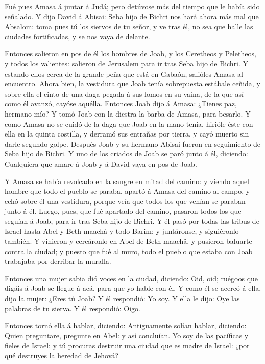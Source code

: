  Fué pues Amasa á juntar á Judá; pero detúvose más del
tiempo que le había sido señalado.  Y dijo David á Abisai:
Seba hijo de Bichri nos hará ahora más mal que Absalom: toma pues tú los
siervos de tu señor, y ve tras él, no sea que halle las ciudades
fortificadas, y se nos vaya de delante.

 Entonces salieron en pos de él los hombres de Joab, y los
Ceretheos y Peletheos, y todos los valientes: salieron de Jerusalem para
ir tras Seba hijo de Bichri.  Y estando ellos cerca de la
grande peña que está en Gabaón, salióles Amasa al encuentro. Ahora bien,
la vestidura que Joab tenía sobrepuesta estábale ceñida, y sobre ella el
cinto de una daga pegada á sus lomos en su vaina, de la que así como él
avanzó, cayóse aquélla.  Entonces Joab dijo á Amasa: ¿Tienes
paz, hermano mío? Y tomó Joab con la diestra la barba de Amasa, para
besarlo.  Y como Amasa no se cuidó de la daga que Joab en
la mano tenía, hirióle éste con ella en la quinta costilla, y derramó
sus entrañas por tierra, y cayó muerto sin darle segundo golpe. Después
Joab y su hermano Abisai fueron en seguimiento de Seba hijo de Bichri.
 Y uno de los criados de Joab se paró junto á él, diciendo:
Cualquiera que amare á Joab y á David vaya en pos de Joab.

 Y Amasa se había revolcado en la sangre en mitad del
camino: y viendo aquel hombre que todo el pueblo se paraba, apartó á
Amasa del camino al campo, y echó sobre él una vestidura, porque veía
que todos los que venían se paraban junto á él.  Luego,
pues, que fué apartado del camino, pasaron todos los que seguían á Joab,
para ir tras Seba hijo de Bichri.  Y él pasó por todas las
tribus de Israel hasta Abel y Beth-maachâ y todo Barim: y juntáronse, y
siguiéronlo también.  Y vinieron y cercáronlo en Abel de
Beth-maachâ, y pusieron baluarte contra la ciudad; y puesto que fué al
muro, todo el pueblo que estaba con Joab trabajaba por derribar la
muralla.

 Entonces una mujer sabia dió voces en la ciudad, diciendo:
Oid, oid; ruégoos que digáis á Joab se llegue á acá, para que yo hable
con él.  Y como él se acercó á ella, dijo la mujer: ¿Eres
tú Joab? Y él respondió: Yo soy. Y ella le dijo: Oye las palabras de tu
sierva. Y él respondió: Oigo.

 Entonces tornó ella á hablar, diciendo: Antiguamente
solían hablar, diciendo: Quien preguntare, pregunte en Abel: y así
concluían.  Yo soy de las pacíficas y fieles de Israel: y
tú procuras destruir una ciudad que es madre de Israel: ¿por qué
destruyes la heredad de Jehová?

